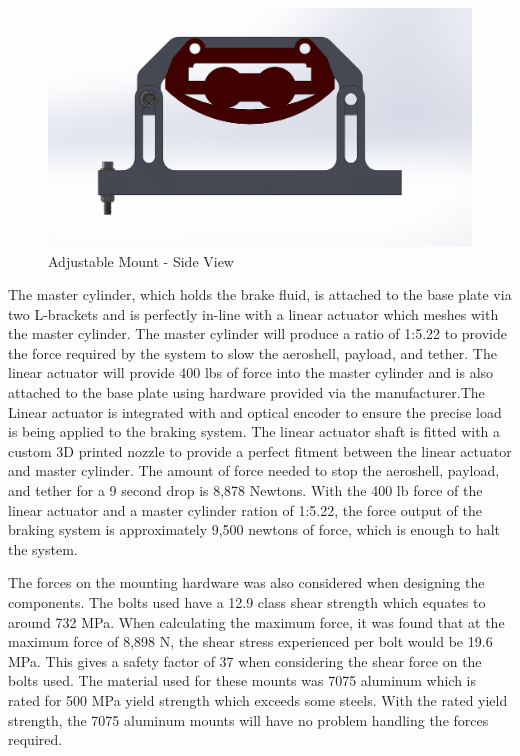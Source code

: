 \begin{figure}[!ht]
\centering
\begin{minipage}{.5\textwidth}
  \centering
  \includegraphics[width=1\linewidth]{TUMBR/adjustable1.png}
  \caption{\label{fig:Mount2}Adjustable Mount - Side View}
\end{minipage}
\end{figure}

The master cylinder, which holds the brake fluid, is attached to the base plate via two L-brackets and is perfectly in-line with a linear actuator which meshes with the master cylinder. The master cylinder will produce a ratio of 1:5.22 to provide the force required by the system to slow the aeroshell, payload, and tether. The linear actuator will provide 400 lbs of force into the master cylinder and is also attached to the base plate using hardware provided via the manufacturer.The Linear actuator is integrated with and optical encoder to ensure the precise load is being applied to the braking system. The linear actuator shaft is fitted with a custom 3D printed nozzle to provide a perfect fitment between the linear actuator and master cylinder. The amount of force needed to stop the aeroshell, payload, and tether for a 9 second drop is 8,878 Newtons. With the 400 lb force of the linear actuator and a master cylinder ration of 1:5.22, the force output of the braking system is approximately 9,500 newtons of force, which is enough to halt the system.

The forces on the mounting hardware was also considered when designing the components. The bolts used have a 12.9 class shear strength which equates to around 732 MPa. When calculating the maximum force, it was found that at the maximum force of 8,898 N, the shear stress experienced per bolt would be 19.6 MPa. This gives a safety factor of 37 when considering the shear force on the bolts used. The material used for these mounts was 7075 aluminum which is rated for 500 MPa yield strength which exceeds some steels. With the rated yield strength, the 7075 aluminum mounts will have no problem handling the forces required.

